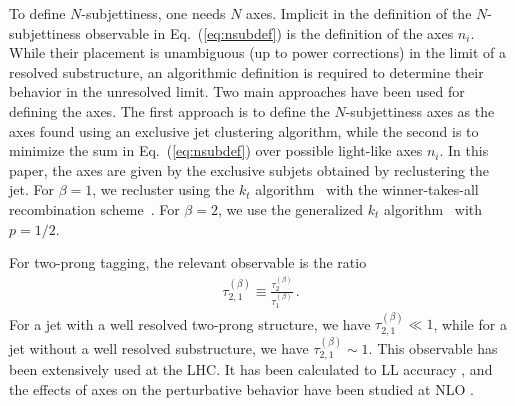 \documentclass[11pt,letterpaper]{article}
\DeclareRobustCommand{\Eq}[1]{Eq.~(\ref{#1})}
\newcommand{\Nsub}[2]{\tau_{#1}^{(#2)}}
\begin{document}
To define $N$-subjettiness, one needs $N$ axes.
%
Implicit in the definition of the $N$-subjettiness observable in
\Eq{eq:nsubdef} is the definition of the axes $n_i$.
%
While their
placement is unambiguous (up to power corrections) in the limit of a
resolved substructure, an algorithmic definition is required to
determine their behavior in the unresolved limit.
%
Two main approaches
have been used for defining the axes.
%
The first approach is to define
the $N$-subjettiness axes as the axes found using an exclusive jet
clustering algorithm, while the second is to minimize the sum in
\Eq{eq:nsubdef} over possible light-like axes $n_i$.
%
In this paper, the axes are given by the exclusive subjets obtained by reclustering the jet.
%
For $\beta = 1$, we recluster using the $k_t$ algorithm~\cite{Catani:1993hr} with the
  winner-takes-all recombination scheme~\cite{Larkoski:2014uqa}.
%
For $\beta = 2$, we use the generalized $k_t$ algorithm~\cite{Cacciari:2011ma} with $p=1/2$.

For two-prong tagging, the relevant observable is the ratio \cite{Thaler:2010tr}
\begin{align}
\Nsub{2,1}{\beta}\equiv \frac{\Nsub{2}{\beta}}{\Nsub{1}{\beta}}\,.
\end{align}
For a jet with a well resolved two-prong structure, we have $\Nsub{2,1}{\beta}\ll 1$, while for a jet without a well resolved substructure, we have $\Nsub{2,1}{\beta}\sim 1$.
%
This observable has been extensively used at the LHC.
%
It has been calculated to LL accuracy \cite{Dasgupta:2015lxh}, and the effects of axes on the perturbative behavior have been studied at NLO \cite{Larkoski:2015uaa}.
\end{document}
